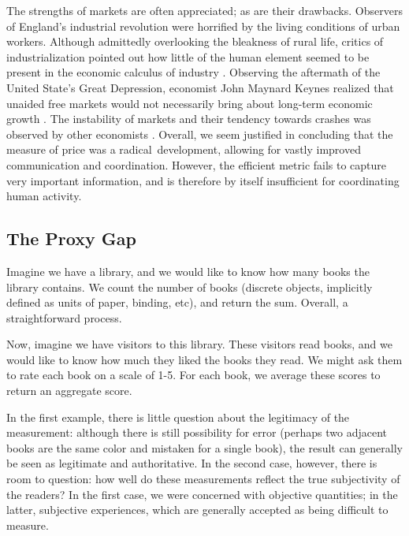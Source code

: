 \bigskip

The strengths of markets are often appreciated; as are their drawbacks.
Observers of England's industrial revolution were horrified by the living conditions of urban workers.
Although admittedly overlooking the bleakness of rural life, critics of industrialization pointed out how little of the human element seemed to be present in the economic calculus of industry \cite{heilbroner}.
Observing the aftermath of the United State's Great Depression, economist John Maynard Keynes realized that unaided free markets would not necessarily bring about long-term economic growth \cite{heilbroner}.
The instability of markets and their tendency towards crashes was observed by other economists \cite{minsky}.
Overall, we seem justified in concluding that the measure of price was a radical development, allowing for vastly improved communication and coordination.
However, the efficient metric fails to capture very important information, and is therefore by itself insufficient for coordinating human activity.


\subsection{The Proxy Gap}

Imagine we have a library, and we would like to know how many books the library contains. We count the number of books (discrete objects, implicitly defined as units of paper, binding, etc), and return the sum. Overall, a straightforward process.

Now, imagine we have visitors to this library. These visitors read books, and we would like to know how much they liked the books they read. We might ask them to rate each book on a scale of 1-5. For each book, we average these scores to return an aggregate score.

In the first example, there is little question about the legitimacy of the measurement: although there is still possibility for error (perhaps two adjacent books are the same color and mistaken for a single book), the result can generally be seen as legitimate and authoritative. In the second case, however, there is room to question: how well do these measurements reflect the true subjectivity of the readers? In the first case, we were concerned with objective quantities; in the latter, subjective experiences, which are generally accepted as being difficult to measure.

\bigskip

